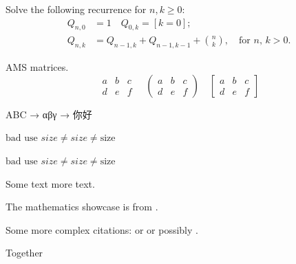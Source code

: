 \documentclass[a4paper,12pt]{book} %
\begin{document}
Solve the following recurrence for $ n,k\geq 0 $:
\begin{align*}
Q_{n,0} &= 1   \quad Q_{0,k} = [k=0];  \\
Q_{n,k} &= Q_{n-1,k}+Q_{n-1,k-1}+\binom{n}{k}, \quad\text{for $n$, $k>0$.}
\end{align*}

AMS matrices.
\[
\begin{matrix}
a & b & c \\
d & e & f
\end{matrix}
\quad
\begin{pmatrix}
a & b & c \\
d & e & f
\end{pmatrix}
\quad
\begin{bmatrix}
a & b & c \\
d & e & f
\end{bmatrix}
\]


ABC → αβγ → {\cjkfont 你好}

$\text{bad use } size  \neq \mathit{size} \neq \mathrm{size} $

\textit{$\text{bad use } size \neq \mathit{size} \neq \mathrm{size} $}

Some text \hspace{1cm} more text.

\vspace{10cm}










The mathematics showcase is from \autocite{Graham1995}.

Some more complex citations: \parencite{Graham1995} or
\textcite{Thomas2008} or possibly .

\autocite[56]{Thomas2008}

\autocite[See][45-48]{Graham1995}

Together \autocite{Thomas2008,Graham1995}

\printbibliography
\end{document}
